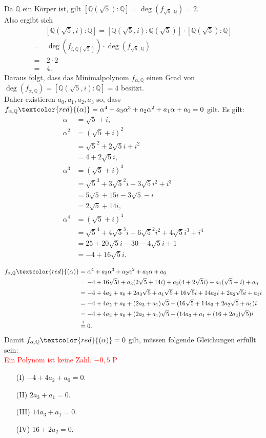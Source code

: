 \documentclass[12pt]{article}
\newcommand{\corr}[1]{\textcolor{red}{#1}}
\newcommand{\grad}{\operatorname{deg}}
\begin{document}
\begin{enumerate}
	Da $\mathbb{Q}$ ein Körper ist, gilt $\left[\mathbb{Q}(\sqrt{5}):\mathbb{Q}\right]=\grad(f_{\sqrt{5},\mathbb{Q}})=2$. \\
	Also ergibt sich 
	\begin{align*}
		&\left[\mathbb{Q}(\sqrt{5},i):\mathbb{Q}\right]=\left[\mathbb{Q}(\sqrt{5},i):\mathbb{Q}(\sqrt{5})\right]\cdot\left[\mathbb{Q}(\sqrt{5}):\mathbb{Q}\right] \\
		=&\,\grad(f_{i,\mathbb{Q}(\sqrt{5})})\cdot\grad(f_{\sqrt{5},\mathbb{Q}}) \\
		=&\,2\cdot2 \\
		=&\,4.
	\end{align*}
	Daraus folgt, dass das Minimalpolynom $f_{\alpha,\mathbb{Q}}$ einen Grad von $\grad(f_{\alpha,\mathbb{Q}})=\left[\mathbb{Q}(\sqrt{5},i):\mathbb{Q}\right]=4$ besitzt. \\
Daher existieren $a_0,a_1,a_2,a_3$ so, dass $f_{\alpha,\mathbb{Q}}\corr{(\alpha)}=\alpha^4+a_3\alpha^3+a_2\alpha^2+a_1\alpha+a_0=0$ gilt.
	Es gilt:
	\begin{align*}
		\alpha&=\sqrt{5}+i, \\
		\alpha^2&=(\sqrt{5}+i)^2 \\
		&=\sqrt{5}^2+2\sqrt{5}i+i^2 \\
		&=4+2\sqrt{5}i, \\
		\alpha^3&=(\sqrt{5}+i)^3 \\
		&=\sqrt{5}^3+3\sqrt{5}^2i+3\sqrt{5}i^2+i^3 \\
		&=5\sqrt{5}+15i-3\sqrt{5}-i \\
		&=2\sqrt{5}+14i, \\
		\alpha^4&=(\sqrt{5}+i)^4 \\
		&=\sqrt{5}^4+4\sqrt{5}^3i+6\sqrt{5}^2i^2+4\sqrt{5}i^3+i^4 \\
		&=25+20\sqrt{5}i-30-4\sqrt{5}i+1 \\
		&=-4+16\sqrt{5}i. \\
	\end{align*}
	\begin{align*}		
		f_{\alpha,\mathbb{Q}}\corr{(\alpha)}&=\alpha^4+a_3\alpha^3+a_2\alpha^2+a_1\alpha+a_0 \\
		&=-4+16\sqrt{5}i+a_3(2\sqrt{5}+14i)+a_2(4+2\sqrt{5}i)+a_1(\sqrt{5}+i)+a_0 \\
		&=-4+4a_2+a_0+2a_3\sqrt{5}+a_1\sqrt{5}+16\sqrt{5}i+14a_3i+2a_2\sqrt{5}i+a_1i \\
		&=-4+4a_2+a_0+(2a_3+a_1)\sqrt{5}+(16\sqrt{5}+14a_3+2a_2\sqrt{5}+a_1)i \\
		&=-4+4a_2+a_0+(2a_3+a_1)\sqrt{5}+(14a_3+a_1+(16+2a_2)\sqrt{5})i \\
		&\overset{!}{=}0.
	\end{align*}
	Damit $f_{\alpha,\mathbb{Q}}\corr{(\alpha)}=0$ gilt, müssen folgende Gleichungen erfüllt sein:\\
\corr{Ein Polynom ist keine Zahl. $-0,5$ P}
	\begin{enumerate}
		\item[(I)] $-4+4a_2+a_0=0$.
		\item[(II)] $2a_3+a_1=0$.
		\item[(III)] $14a_3+a_1=0$.
		\item[(IV)] $16+2a_2=0$.\\
		

\end{enumerate}
\end{enumerate}
\end{document}
